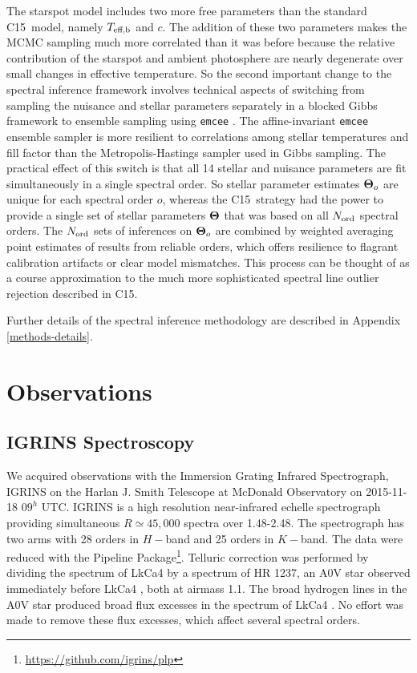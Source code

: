 \documentclass[twocolumn]{emulateapj}%
\newcommand{\iancze}{{\sc C15}}
\newcommand{\name}{LkCa4 }
\begin{document}
The starspot model includes two more free parameters than the standard \iancze\ model, namely $T_\textrm{eff,b}$ and $c$.  The addition of these two parameters makes the MCMC sampling much more correlated than it was before because the relative contribution of the starspot and ambient photosphere are nearly degenerate over small changes in effective temperature.  So the second important change to the spectral inference framework involves technical aspects of switching from sampling the nuisance and stellar parameters separately in a blocked Gibbs framework to ensemble sampling using \texttt{emcee} \citep{foreman13}.  The affine-invariant \texttt{emcee} ensemble sampler is more resilient to correlations among stellar temperatures and fill factor than the Metropolis-Hastings sampler used in Gibbs sampling.  The practical effect of this switch is that all 14 stellar and nuisance parameters are fit simultaneously in a single spectral order.  So stellar parameter estimates ${\bm \Theta}_{o}$ are unique for each spectral order $o$, whereas the \iancze\ strategy had the power to provide a single set of stellar parameters ${\bm \Theta}$ that was based on all $N_{\rm ord}$ spectral orders.  The $N_{\rm ord}$ sets of inferences on ${\bm \Theta}_{o}$ are combined by weighted averaging point estimates of results from reliable orders, which offers resilience to flagrant calibration artifacts or clear model mismatches.  This process can be thought of as a course approximation to the much more sophisticated spectral line outlier rejection described in \iancze.

Further details of the spectral inference methodology are described in Appendix \ref{methods-details}.


\section{Observations}\label{sec:obs} 

\subsection{IGRINS Spectroscopy}\label{sec:igrins} 
We acquired observations with the Immersion Grating Infrared Spectrograph, IGRINS \citep{gully12,park14} on the Harlan J. Smith Telescope at McDonald Observatory on 2015-11-18 $09^h$ UTC.  IGRINS is a high resolution near-infrared echelle spectrograph providing simultaneous $R\simeq45,000$ spectra over 1.48-2.48\um.  The spectrograph has two arms with 28 orders in $H-$band and 25 orders in $K-$band.  The data were reduced with the Pipeline Package\footnote{\url{https://github.com/igrins/plp}}.  Telluric correction was performed by dividing the spectrum of \name by a spectrum of HR 1237, an A0V star observed immediately before \name, both at airmass 1.1.  The broad hydrogen lines in the A0V star produced broad flux excesses in the spectrum of \name.  No effort was made to remove these flux excesses, which affect several spectral orders. 
\end{document}
